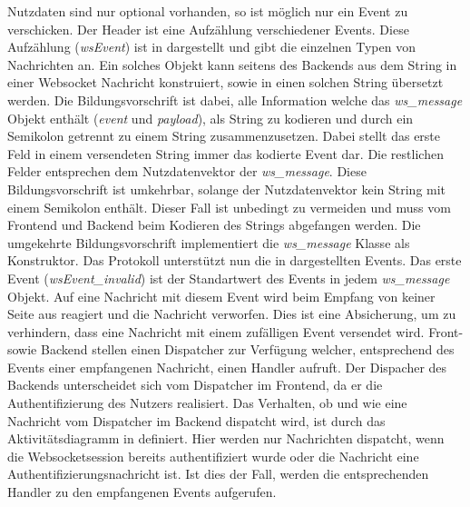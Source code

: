 Nutzdaten sind nur optional vorhanden, so ist möglich nur ein Event zu verschicken.
Der Header ist eine Aufzählung verschiedener Events. 
Diese Aufzählung (\emph{wsEvent}) ist in  dargestellt und gibt die einzelnen Typen von Nachrichten an. 
Ein solches Objekt kann seitens des Backends aus dem String in einer Websocket Nachricht konstruiert, 
sowie in einen solchen String übersetzt werden. 
Die Bildungsvorschrift ist dabei, alle Information welche das \emph{ws\_message} Objekt enthält (\emph{event} und \emph{payload}), als String zu kodieren 
und durch ein Semikolon getrennt zu einem String zusammenzusetzen.
Dabei stellt das erste Feld in einem versendeten String immer das kodierte Event dar. Die restlichen Felder entsprechen dem Nutzdatenvektor der \emph{ws\_message}.
Diese Bildungsvorschrift ist umkehrbar, solange der Nutzdatenvektor kein String mit einem Semikolon enthält.
Dieser Fall ist unbedingt zu vermeiden und muss vom Frontend und Backend beim Kodieren des Strings abgefangen werden.
Die umgekehrte Bildungsvorschrift implementiert die \emph{ws\_message} Klasse als Konstruktor. 
Das Protokoll unterstützt nun die in  dargestellten Events.
Das erste Event (\emph{wsEvent\_invalid}) ist der Standartwert des Events in jedem \emph{ws\_message} Objekt. 
Auf eine Nachricht mit diesem Event wird beim Empfang von keiner Seite aus reagiert und die Nachricht verworfen.
Dies ist eine Absicherung, um zu verhindern, dass eine Nachricht mit einem zufälligen Event versendet wird.
Front- sowie Backend stellen einen Dispatcher zur Verfügung welcher, entsprechend des Events einer empfangenen Nachricht, einen Handler aufruft.
Der Dispacher des Backends unterscheidet sich vom Dispatcher im Frontend, da er die Authentifizierung des Nutzers realisiert.
Das Verhalten, ob und wie eine Nachricht vom Dispatcher im Backend dispatcht wird, 
ist durch das Aktivitätsdiagramm in  definiert.
Hier werden nur Nachrichten dispatcht, wenn die Websocketsession bereits authentifiziert wurde oder die Nachricht eine Authentifizierungsnachricht ist.
Ist dies der Fall, werden die entsprechenden Handler zu den empfangenen Events aufgerufen.

